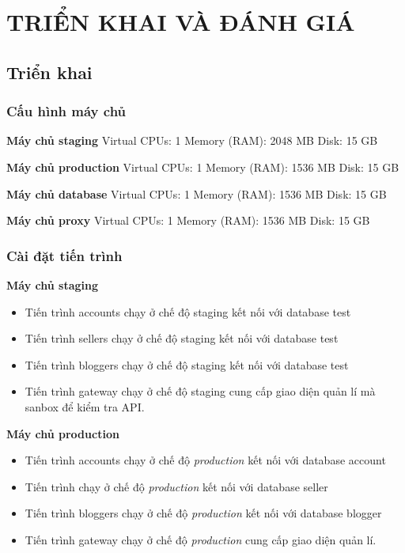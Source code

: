 
\chapter{TRIỂN KHAI VÀ ĐÁNH GIÁ}\label{section:dev}

\section{Triển khai}

\subsection{Cấu hình máy chủ}

\textbf{Máy chủ staging}
Virtual CPUs: 1
Memory (RAM): 2048 MB
Disk: 15 GB

\textbf{Máy chủ production}
Virtual CPUs: 1
Memory (RAM): 1536 MB
Disk: 15 GB

\textbf{Máy chủ database}
Virtual CPUs: 1
Memory (RAM): 1536 MB
Disk: 15 GB

\textbf{Máy chủ proxy}
Virtual CPUs: 1
Memory (RAM): 1536 MB
Disk: 15 GB

\subsection{Cài đặt tiến trình}


\textbf{Máy chủ staging}
\begin{itemize}
	\item Tiến trình accounts chạy ở chế độ staging kết nối với database test
	\item Tiến trình sellers chạy ở chế độ staging kết nối với database test
	\item Tiến trình bloggers chạy ở chế độ staging kết nối với database test
	\item Tiến trình gateway chạy ở chế độ staging cung cấp giao diện quản lí mà sanbox để kiểm tra API.
\end{itemize}

\textbf{Máy chủ production}
\begin{itemize}
	\item Tiến trình accounts chạy ở chế độ \emph{production} kết nối với database account
	\item Tiến trình  chạy ở chế độ \emph{production} kết nối với database seller
	\item Tiến trình bloggers chạy ở chế độ \emph{production} kết nối với database blogger
	\item Tiến trình gateway chạy ở chế độ \emph{production} cung cấp giao diện quản lí.
\end{itemize}

